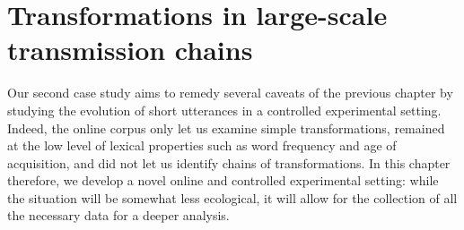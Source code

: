 \documentclass[english,]{article}
\begin{document}




\section{Transformations in large-scale transmission chains}
\label{sec:gistr}

Our second case study aims to remedy several caveats of the previous chapter by studying the evolution of short utterances in a controlled experimental setting.
Indeed, the online corpus only let us examine simple transformations, remained at the low level of lexical properties such as word frequency and age of acquisition, and did not let us identify chains of transformations.
In this chapter therefore, we develop a novel online and controlled experimental setting: while the situation will be somewhat less ecological, it will allow for the collection of all the necessary data for a deeper analysis.
\end{document}
